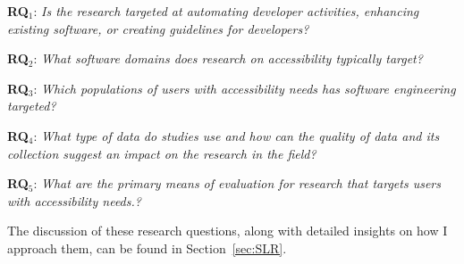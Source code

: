 \begin{description}
  
    \item \textbf{RQ$_1$}: \textit{Is the research targeted at automating developer activities, enhancing existing software, or creating guidelines for developers?}
    \item \textbf{RQ$_2$}: \textit{What software domains does research on accessibility typically target?}
    \item \textbf{RQ$_3$}: \textit{Which populations of users with accessibility needs has software engineering targeted?}
    \item \textbf{RQ$_4$}: \textit{What type of data do studies use and how can the quality of data and its collection suggest an impact on the research in the field?}
    \item \textbf{RQ$_5$}: \textit{What are the primary means of evaluation for research that targets users with accessibility needs.?}

 \end{description}
The discussion of these research questions, along with detailed insights on how I approach them, can be found in Section~\ref{sec:SLR}.



